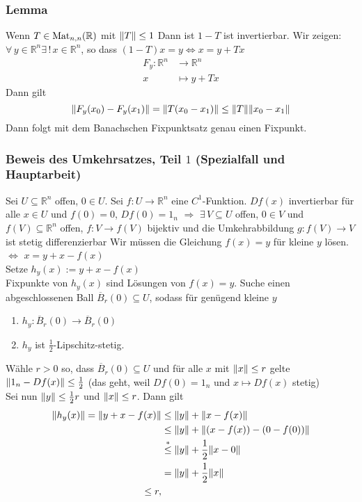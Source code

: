 \subsubsection{Lemma} %
\label{ssub:lemma}
Wenn $T \in \operatorname{Mat}_{n,n}(\mathbb{R})$ mit $\norm{T}\leq 1$ Dann ist $1-T$ ist invertierbar.
Wir zeigen: $\forall\, y \in \mathbb{R}^n \exists\,! \,x \in \mathbb{R}^n$, so dass $(1-T)x=y \Leftrightarrow  x=y+Tx$ \\
\begin{align*}
	F_y: \mathbb{R}^n &\to \mathbb{R}^n \\
	x &\mapsto y+Tx 
\end{align*}
Dann gilt
\[
	\norm{F_y(x_0)-F_y(x_1)} = \norm{T(x_0-x_1)} \leq \norm{T} \norm{x_0-x_1}
\]
Dann folgt mit dem Banachschen Fixpunktsatz genau einen Fixpunkt. \bewende
\subsubsection{Beweis des Umkehrsatzes, Teil $1$ (Spezialfall und Hauptarbeit)} %
\label{ssub:beweis_des_umkehrsatzes_teil_1_spezialfall_und_hauptarbeit}
Sei $ U \subseteq \mathbb{R}^n$ offen, $0 \in U$. Sei $f: U \to \mathbb{R}^n$ eine $C^1$-Funktion. $Df(x)$ invertierbar für alle $x \in U$ und $f(0)=0$, $Df(0)=1_n$
$\Rightarrow $ $\exists\, V \subseteq U$ offen, $0 \in V$ und $f(V) \subseteq \mathbb{R}^n$ offen, $f:V \to f(V)$ bijektiv und die Umkehrabbildung $g: f(V) \to V$ ist stetig differenzierbar
 Wir müssen die Gleichung $f(x)=y$ für kleine $y$ lösen.
$\Leftrightarrow$ $x = y + x - f(x)$ \\
Setze $h_y(x):= y + x - f(x)$ \\
Fixpunkte von $h_y(x)$ sind Lösungen von $f(x)=y$. Suche einen abgeschlossenen Ball $\overline{B}_r(0) \subseteq U$, sodass für genügend kleine $y$
\begin{enumerate}
	\item $h_y: \overline{B}_r(0) \to \overline{B}_r(0)$
	\item $h_y$ ist $\frac{1}{2}$-Lipschitz-stetig.
\end{enumerate}
Wähle $r>0$ so, dass $\overline{B}_r(0) \subseteq U$ und für alle $x$ mit $\norm{x}\leq r$ gelte $\norm{1_n - Df(x)} \leq \frac{1}{2}$
(das geht, weil $Df(0)=1_n$ und $x \mapsto Df(x)$ stetig) \\
Sei nun $\norm{y} \leq \frac{1}{2}r$ und $\norm{x} \leq r$. Dann gilt
\begin{align*}
	\norm{h_y(x)} = \norm{y + x - f(x)} &\leq \norm{y} + \norm{x-f(x)} \\
	&\leq \norm{y}+ \norm{(x-f(x))-(0-f(0))} \\
	&\stackrel{*}{\leq} \norm{y} + \frac{1}{2} \norm{x-0} \\
	&= \norm{y}+ \frac{1}{2} \norm{x} \\
	\leq r,
\end{align*}
